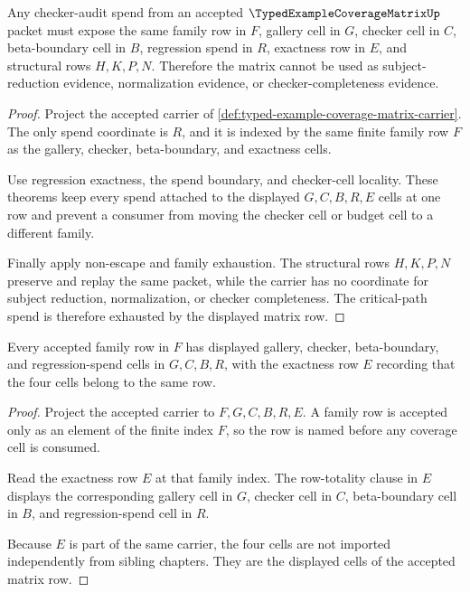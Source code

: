 \begin{theorem}
\label{thm:typed-example-coverage-matrix-criticalpath-budget-exhaustion}
Any checker-audit spend from an accepted $\TypedExampleCoverageMatrixUp$ packet must expose the same family row in $F$, gallery cell in $G$, checker cell in $C$, beta-boundary cell in $B$, regression spend in $R$, exactness row in $E$, and structural rows $H,K,P,N$. Therefore the matrix cannot be used as subject-reduction evidence, normalization evidence, or checker-completeness evidence.
\end{theorem}
\begin{proof}
Project the accepted carrier of \autoref{def:typed-example-coverage-matrix-carrier}. The only spend coordinate is $R$, and it is indexed by the same finite family row $F$ as the gallery, checker, beta-boundary, and exactness cells.

Use regression exactness, the spend boundary, and checker-cell locality. These theorems keep every spend attached to the displayed $G,C,B,R,E$ cells at one row and prevent a consumer from moving the checker cell or budget cell to a different family.

Finally apply non-escape and family exhaustion. The structural rows $H,K,P,N$ preserve and replay the same packet, while the carrier has no coordinate for subject reduction, normalization, or checker completeness. The critical-path spend is therefore exhausted by the displayed matrix row.
\end{proof}

\begin{theorem}
\label{thm:typed-example-coverage-matrix-row-totality}
Every accepted family row in $F$ has displayed gallery, checker, beta-boundary, and regression-spend cells in $G,C,B,R$, with the exactness row $E$ recording that the four cells belong to the same row.
\end{theorem}
\begin{proof}
Project the accepted carrier to $F,G,C,B,R,E$. A family row is accepted only as an element of the finite index $F$, so the row is named before any coverage cell is consumed.

Read the exactness row $E$ at that family index. The row-totality clause in $E$ displays the corresponding gallery cell in $G$, checker cell in $C$, beta-boundary cell in $B$, and regression-spend cell in $R$.

Because $E$ is part of the same carrier, the four cells are not imported independently from sibling chapters. They are the displayed cells of the accepted matrix row.
\end{proof}

